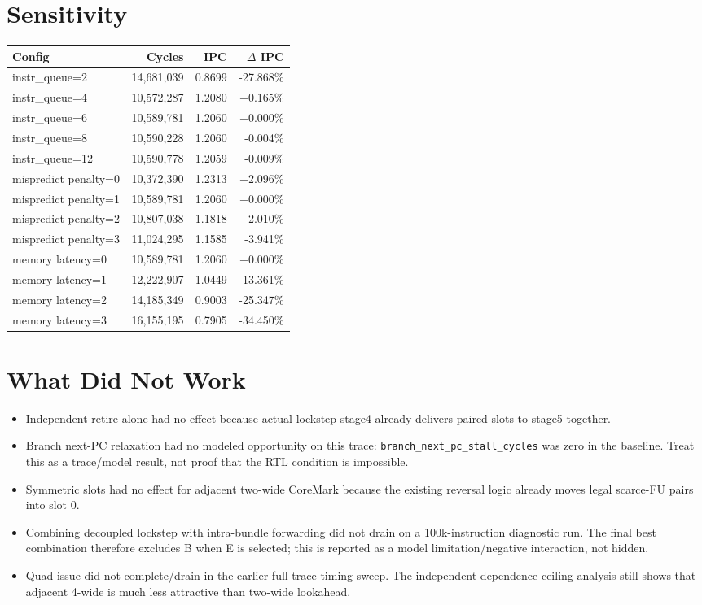 \documentclass[10pt]{article}
\begin{document}
\section*{Sensitivity}

\begin{longtable}{@{}p{0.42\linewidth}rrr@{}}
\toprule
Config & Cycles & IPC & $\Delta$ IPC \\
\midrule
\endhead
instr\_queue=2 & 14,681,039 & 0.8699 & -27.868\% \\
instr\_queue=4 & 10,572,287 & 1.2080 & +0.165\% \\
instr\_queue=6 & 10,589,781 & 1.2060 & +0.000\% \\
instr\_queue=8 & 10,590,228 & 1.2060 & -0.004\% \\
instr\_queue=12 & 10,590,778 & 1.2059 & -0.009\% \\
mispredict penalty=0 & 10,372,390 & 1.2313 & +2.096\% \\
mispredict penalty=1 & 10,589,781 & 1.2060 & +0.000\% \\
mispredict penalty=2 & 10,807,038 & 1.1818 & -2.010\% \\
mispredict penalty=3 & 11,024,295 & 1.1585 & -3.941\% \\
memory latency=0 & 10,589,781 & 1.2060 & +0.000\% \\
memory latency=1 & 12,222,907 & 1.0449 & -13.361\% \\
memory latency=2 & 14,185,349 & 0.9003 & -25.347\% \\
memory latency=3 & 16,155,195 & 0.7905 & -34.450\% \\
\bottomrule
\end{longtable}

\section*{What Did Not Work}

\begin{itemize}
\item Independent retire alone had no effect because actual lockstep stage4
already delivers paired slots to stage5 together.
\item Branch next-PC relaxation had no modeled opportunity on this trace:
\texttt{branch\_next\_pc\_stall\_cycles} was zero in the baseline. Treat this as
a trace/model result, not proof that the RTL condition is impossible.
\item Symmetric slots had no effect for adjacent two-wide CoreMark because the
existing reversal logic already moves legal scarce-FU pairs into slot 0.
\item Combining decoupled lockstep with intra-bundle forwarding did not drain on
a 100k-instruction diagnostic run. The final best combination therefore excludes
B when E is selected; this is reported as a model limitation/negative
interaction, not hidden.
\item Quad issue did not complete/drain in the earlier full-trace timing sweep.
The independent dependence-ceiling analysis still shows that adjacent 4-wide is
much less attractive than two-wide lookahead.
\end{itemize}
\end{document}
